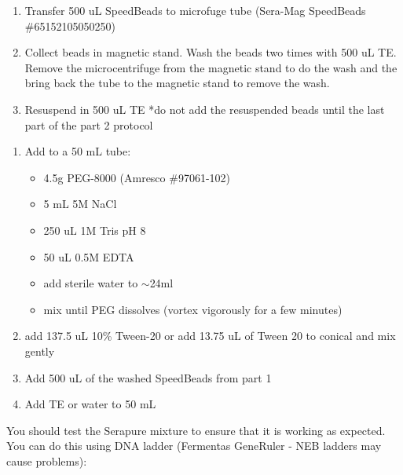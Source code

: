 \documentclass[11pt, oneside]{article}
\begin{document}
		\vspace{3mm}
		
		
		\begin{enumerate}	
			\item Transfer 500 uL SpeedBeads to microfuge tube (Sera-Mag SpeedBeads \#65152105050250)
			\item Collect beads in magnetic stand. Wash the beads two times with 500 uL TE. Remove the microcentrifuge from the magnetic stand to do 			the wash and the bring back the tube to the magnetic stand to remove the wash. 
			\item Resuspend in 500 uL TE *do not add the resuspended beads until the last part of the part 2 protocol
		\end{enumerate}
		
		\vspace{3mm}
		
		
			\begin{enumerate}
				\itemsep0mm
				\item Add to a 50 mL tube:
				\begin{itemize}
					\item 4.5g PEG-8000 	(Amresco \#97061-102)
					\item 5 mL 5M NaCl
					\item 250 uL 1M Tris pH 8
					\item 50 uL 0.5M EDTA
					\item add sterile water to $\sim$24ml
					\item mix until PEG dissolves (vortex vigorously for a few minutes)
				\end{itemize}	
				\item add 137.5 uL 10\% Tween-20 or add 13.75 uL of Tween 20 to conical and mix gently
				\item Add 500 uL of the washed SpeedBeads from part 1
				\item Add TE or water to 50 mL 
			\end{enumerate}
		
		\vspace{3mm}
		
		
		\vspace{3mm}
		
		\noindent You should test the Serapure mixture to ensure that it is working as expected. You can do this using DNA ladder (Fermentas GeneRuler - 		NEB ladders may cause problems):
		
\end{document}

